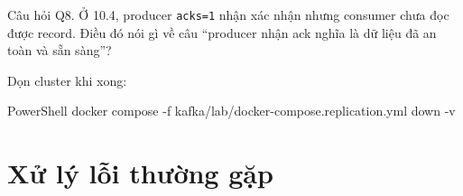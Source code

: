\begin{questionbox}{Câu hỏi Q8.}
Ở 10.4, producer \texttt{acks=\allowbreak{}1} nhận xác nhận nhưng consumer chưa đọc được record. Điều đó nói gì về câu “producer nhận ack nghĩa là dữ liệu đã an toàn và sẵn sàng”?
\end{questionbox}

Dọn cluster khi xong:


\begin{aivncodebox}[language={}]{PowerShell}
docker compose -f kafka/lab/docker-compose.replication.yml down -v
\end{aivncodebox}

\section{Xử lý lỗi thường gặp}

